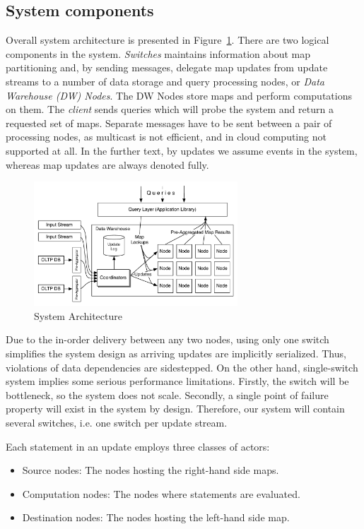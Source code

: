 \documentclass{sig-semester}
\begin{document}
\subsection{System components}
\label{Components}
\vspace{2mm}

Overall system architecture is presented in Figure~\ref{fig:architecture}. There are two logical components in the system.
\textit{Switches} maintains information about map partitioning and, by sending messages, delegate map updates from update streams to a number of data storage and query processing nodes, or \textit{Data Warehouse (DW) Nodes}. The DW Nodes store maps and perform computations on them. The \textit{client} sends queries which will probe the system and return a requested set of maps. Separate messages have to be sent between a pair of processing nodes, as multicast is not efficient, and in cloud computing not supported at all. In the further text, by updates we assume events in the system, whereas map updates are always denoted fully.

\begin{figure}
\includegraphics[width=3in]{Architecture.pdf}
\vspace{-3mm}
\caption{System Architecture}
\label{fig:architecture}
\vspace{-2mm}
\end{figure}

Due to the in-order delivery between any two nodes, using only one switch simplifies the system design as arriving updates are implicitly serialized. Thus, violations of data dependencies are sidestepped. On the other hand, single-switch system implies some serious performance limitations. Firstly, the switch will be bottleneck, so the system does not scale. Secondly, a single point of failure property will exist in the system by design. Therefore, our system will contain several switches, i.e. one switch per update stream.

Each statement in an update employs three classes of actors:
\begin{itemize}
 \item Source nodes: The nodes hosting the right-hand side maps.
 \item Computation nodes: The nodes where statements are evaluated.
 \item Destination nodes: The nodes hosting the left-hand side map.
\end{itemize}
\end{document}
